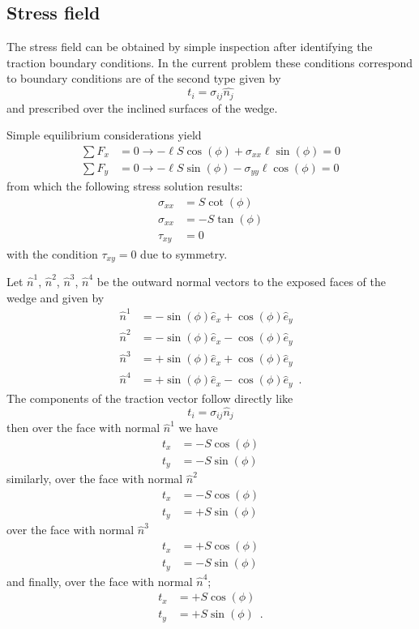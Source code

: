 \subsection*{Stress field}

The stress field can be obtained by simple inspection after identifying the traction boundary conditions. In the current problem these conditions correspond to boundary conditions are of the second type given by
\begin{equation}
t_i=\sigma_{ij}\hat{n_j}
\label{eq:bcs}
\end{equation}
and prescribed over the inclined surfaces of the wedge.

Simple equilibrium considerations yield
\begin{align*}
\sum F_x &= 0 \longrightarrow -\ell S\cos(\phi)  + \sigma_{xx}\ell \sin(\phi) = 0\\
\sum F_y &= 0 \longrightarrow -\ell S\sin(\phi) - \sigma_{yy}\ell \cos(\phi)=0
\end{align*}
from which the following stress solution results:
\begin{equation}
\begin{aligned}
\sigma_{xx}& = S \cot(\phi)\\
\sigma_{xx}& = -S\tan(\phi)\\
\tau_{xy}& = 0
\end{aligned}
\label{eq:solution}
\end{equation}
with the condition $\tau_{xy}=0$ due to symmetry.

Let $\hat{n}^1$,  $\hat{n}^2$, $\hat{n}^3$, $\hat{n}^4$ be the outward normal vectors to the exposed faces of the wedge and given by
\begin{align*}
\hat{n}^1 &= -\sin(\phi)\hat{e}_{x}+\cos(\phi)\hat{e}_{y}\\
\hat{n}^2 &= -\sin(\phi)\hat{e}_{x}-\cos(\phi)\hat{e}_{y}\\
\hat{n}^3 &= +\sin(\phi)\hat{e}_{x}+\cos(\phi)\hat{e}_{y}\\
\hat{n}^4 &= +\sin(\phi)\hat{e}_{x}-\cos(\phi)\hat{e}_{y} \enspace .
\end{align*}
The components of the traction vector follow directly like
\[t_{i} = \sigma_{ij}\hat{n}_{j}\]
then over the face with normal $\hat{n}^1$ we have
\begin{align*}
t_{x} &= -S\cos(\phi)\\
t_{y} &= -S\sin(\phi)
\end{align*}
similarly, over the face with normal $\hat{n}^2$
\begin{align*}
t_{x} &= -S\cos(\phi)\\
t_{y} &= +S\sin(\phi)
\end{align*}
over the face with normal $\hat{n}^3$ 
\begin{align*}
t_{x} &= +S\cos(\phi)\\
t_{y} &= -S\sin(\phi)
\end{align*}
and finally, over the face with normal $\hat{n}^4$;
\begin{align*}
t_{x} &= +S\cos(\phi)\\
t_{y} &= +S\sin(\phi) \enspace .
\end{align*}

